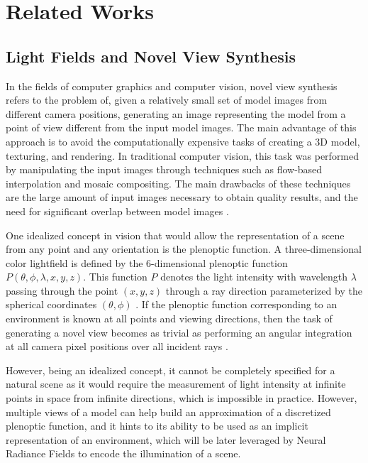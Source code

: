 \section{Related Works}

\subsection{Light Fields and Novel View Synthesis}
In the fields of computer graphics and computer vision, novel view synthesis refers to the problem of, given a relatively small set of model images from different camera positions, generating an image representing the model from a point of view different from the input model images. The main advantage of this approach is to avoid the computationally expensive tasks of creating a 3D model, texturing, and rendering. In traditional computer vision, this task was performed by manipulating the input images through techniques such as flow-based interpolation and mosaic compositing. The main drawbacks of these techniques are the large amount of input images necessary to obtain quality results, and the need for significant overlap between model images \cite{Avidan97}.

One idealized concept in vision that would allow the representation of a scene from any point and any orientation is the plenoptic function. A three-dimensional color lightfield is defined by the 6-dimensional plenoptic function $P(\theta, \phi, \lambda, x, y, z)$. This function $P$ denotes the light intensity with wavelength $\lambda$ passing through the point $(x, y, z)$ through a ray direction parameterized by the spherical coordinates $(\theta, \phi)$ \cite{Landy91}. If the plenoptic function corresponding to an environment is known at all points and viewing directions, then the task of generating a novel view becomes as trivial as performing an angular integration at all camera pixel positions over all incident rays \cite{Martinez-Corral:18}.

However, being an idealized concept, it cannot be completely specified for a natural scene as it would require the measurement of light intensity at infinite points in space from infinite directions, which is impossible in practice. However, multiple views of a model can help build an approximation of a discretized plenoptic function, and it hints to its ability to be used as an implicit representation of an environment, which will be later leveraged by Neural Radiance Fields to encode the illumination of a scene.

